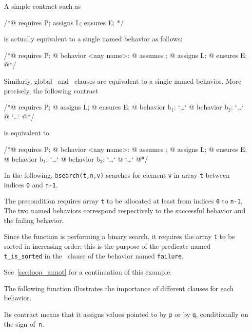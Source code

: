 A simple contract such as
\begin{listing}{1}
/*@ requires P; assigns L; ensures E; */
\end{listing}
is actually equivalent to a single named behavior as follows:
\begin{listing}{1}
/*@ requires P;
  @ behavior <any name>:
  @   assumes \true;
  @   assigns L;
  @   ensures E;
  @*/
\end{listing}
Similarly, global \assigns\ and \ensures\ clauses are equivalent to a
single named behavior. More precisely, the following contract
\begin{listing}{1}
/*@ requires P;
  @ assigns L;
  @ ensures E;
  @ behavior b$_1$: `\dots`
  @ behavior b$_2$: `\dots`
  @ `\dots`
  @*/
\end{listing}
is equivalent to
\begin{listing}{1}
/*@ requires P;
  @ behavior <any name>:
  @   assumes \true;
  @   assigns L;
  @   ensures E;
  @ behavior b$_1$: `\dots`
  @ behavior b$_2$: `\dots`
  @ `\dots`
  @*/
\end{listing}

\begin{example}
\label{ex:bsearch}
In the following, \lstinline|bsearch(t,n,v)| searches for element \lstinline|v|
in array \lstinline|t| between indices \lstinline|0| and \lstinline|n-1|.

%
The precondition requires array \lstinline|t| to be allocated at least
from indices \lstinline|0|
to \lstinline|n-1|. The two named behaviors
correspond respectively to the successful behavior and the failing
behavior.

Since the function is performing a binary search, it requires the
array \lstinline|t| to be sorted in increasing order: this is the purpose of
the predicate named \lstinline|t_is_sorted| in the \assumes\ clause of the
behavior named \lstinline|failure|.

See~\ref{sec:loop_annot} for a continuation of this example.
\end{example}

\begin{example}
  The following function illustrates the importance of different
  \assigns{} clauses for each behavior.

%
  Its contract means that it assigns values pointed to by
  \lstinline|p| or by \lstinline|q|,
  conditionally on the sign of~\lstinline|n|.
\end{example}



